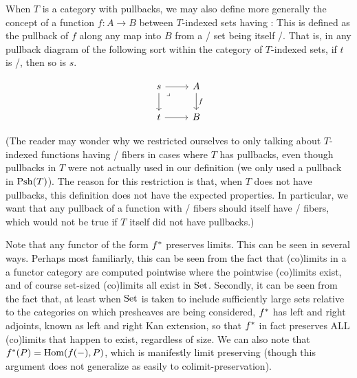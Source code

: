 When $T$ is a category with pullbacks, we may also define more generally the concept of a function $f : A \to B$ between $T$-indexed sets having : This is defined as the pullback of $f$ along any map into $B$ from a \repsmall/ set being itself \repsmall/. That is, in any pullback diagram of the following sort within the category of $T$-indexed sets, if $t$ is \repsmall/, then so is $s$.

\[\begin{tikzcd}
	s & A \\
	t & B
	\arrow["f", from=1-2, to=2-2]
	\arrow[from=2-1, to=2-2]
	\arrow[from=1-1, to=2-1]
	\arrow[from=1-1, to=1-2]
	\arrow["\lrcorner"{anchor=center, pos=0.125}, draw=none, from=1-1, to=2-2]
\end{tikzcd}\]

(The reader may wonder why we restricted ourselves to only talking about $T$-indexed functions having \repsmall/ fibers in cases where $T$ has pullbacks, even though pullbacks in $T$ were not actually used in our definition (we only used a pullback in $\operatorname{Psh}(T)$). The reason for this restriction is that, when $T$ does not have pullbacks, this definition does not have the expected properties. In particular, we want that any pullback of a function with \repsmall/ fibers should itself have \repsmall/ fibers, which would not be true if $T$ itself did not have pullbacks.)

Note that any functor of the form $f^*$ preserves limits. This can be seen in several ways. Perhaps most familiarly, this can be seen from the fact that (co)limits in a a functor category are computed pointwise where the pointwise (co)limits exist, and of course set-sized (co)limits all exist in $\mathrm{Set}$. Secondly, it can be seen from the fact that, at least when $\mathrm{Set}$ is taken to include sufficiently large sets relative to the categories on which presheaves are being considered, $f^*$ has left and right adjoints, known as left and right Kan extension, so that $f^*$ in fact preserves ALL (co)limits that happen to exist, regardless of size. We can also note that $f^*(P) = \operatorname{Hom}(f(-), P)$, which is manifestly limit preserving (though this argument does not generalize as easily to colimit-preservation).

